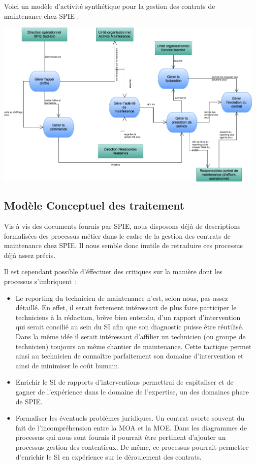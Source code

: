 Voici un modèle d'activité synthétique pour la gestion des contrats de maintenance chez SPIE :

\begin {center}
\includegraphics[width=\textwidth]{png/DiagrammeModeleActivite.png}
\end {center}

\subsection{Modèle Conceptuel des traitement} 
Vis à vis des documents fournis par SPIE, nous disposons déjà de descriptions formalisées des processus métier dans le cadre de la gestion des contrats de maintenance chez SPIE. Il nous semble donc inutile de retraduire ces processus déjà assez précis.

Il est cependant possible d'éffectuer des critiques sur la manière dont les processus s'imbriquent :

\begin{itemize}
\item Le reporting du technicien de maintenance n'est, selon nous, pas assez détaillé. En effet, il serait fortement intéressant de plus faire participer le techniciens à la rédaction, brève bien entendu, d'un rapport d'intervention qui serait concilié au sein du SI afin que son diagnostic puisse être réutilisé. Dans la même idée il serait intéressant d'affilier un technicien (ou groupe de technicien) toujours au même chantier de maintenance. Cette tactique permet ainsi au technicien de connaître parfaitement son domaine d'intervention et ainsi de minimiser le coût humain.
\item Enrichir le SI de rapports d'interventions permettrai de capitaliser et de gagner de l'expérience dans le domaine de l'expertise, un des domaines phare de SPIE.
\item Formaliser les éventuels problèmes juridiques. Un contrat avorte souvent du fait de l'incompréhension entre la MOA et la MOE. Dans les diagrammes de processus qui nous sont fournis il pourrait être pertinent d'ajouter un processus gestion des contentieux. De même, ce processus pourrait permettre d'enrichir le SI en expérience sur le déroulement des contrats.
\end{itemize}


